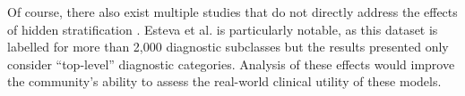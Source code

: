 \documentclass[sigconf,anonymous,review]{acmart}
\begin{document}
 Of course, there also exist multiple studies that do not directly address the effects of hidden stratification \citep{Haenssle2018-vw, Bien2018-ae}. 
 Esteva et al. \citep{Esteva2017-if} is particularly notable, as this dataset is labelled for more than 2,000 diagnostic subclasses but the results presented only consider ``top-level'' diagnostic categories. 
 Analysis of these effects would improve the community's ability to assess the real-world clinical utility of these models. 
 
\end{document}
